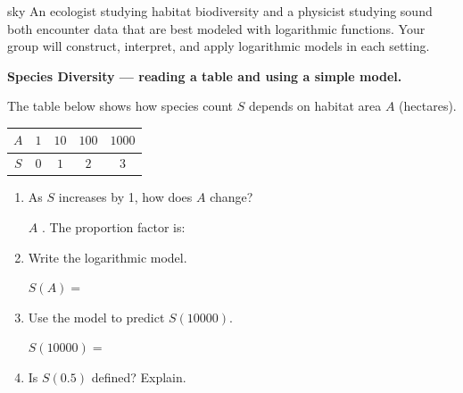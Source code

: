 \documentclass[10pt]{article}
\begin{document}
\namepartnerperiod

\vspace{0.1in}

\begin{scenariobox}{sky}
An ecologist studying habitat biodiversity and a physicist studying sound both encounter
data that are best modeled with logarithmic functions. Your group will construct, interpret,
and apply logarithmic models in each setting.
\end{scenariobox}

\vspace{0.1in}

\begin{tcolorbox}[colback=white, colframe=black!40,
    title=\textbf{Tier R --- Remediate},
    fonttitle=\bfseries, arc=2mm, left=3mm, right=3mm, top=2mm, bottom=2mm]

\textbf{Species Diversity --- reading a table and using a simple model.}

\vspace{4pt}
The table below shows how species count $S$ depends on habitat area $A$ (hectares).

\vspace{4pt}
\begin{center}
\renewcommand{\arraystretch}{1.8}
\begin{tabular}{|c|c|c|c|c|}
\hline
\rowcolor{sky}
$A$ & $1$ & $10$ & $100$ & $1000$ \\
\hline
$S$ & $0$ & $1$  & $2$   & $3$ \\
\hline
\end{tabular}
\end{center}

\begin{enumerate}[leftmargin=1.8em, itemsep=10pt]

\item As $S$ increases by 1, how does $A$ change?

\vspace{4pt}
$A$ . The proportion factor is: 

\item Write the logarithmic model.

\vspace{4pt}
$S(A) = $ 

\item Use the model to predict $S(10000)$.

\vspace{4pt}
$S(10000) = $ 

\item Is $S(0.5)$ defined? Explain.


\end{enumerate}
\end{tcolorbox}
\end{document}
